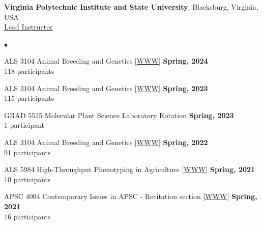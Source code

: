 \documentclass[margin,line,10pt]{res}
\newenvironment{list2}{
  \begin{list}{$\bullet$}{%
      \setlength{\itemsep}{0in}
      \setlength{\parsep}{0in} \setlength{\parskip}{0in}
      \setlength{\topsep}{0in} \setlength{\partopsep}{0in} 
      \setlength{\leftmargin}{0.2in}}}{\end{list}}
\begin{document}
\begin{resume}
{\bf Virginia Polytechnic Institute and State University}, Blacksburg, Virginia, USA  \vspace{0.2cm} \\
\underline{Lead Instructor}
\vspace{0.4cm}
\begin{list2}


  \item ALS 3104 Animal Breeding and Genetics [\textcolor{blue}{\href{http://morotalab.org/als3104-2022/ALS3104.html}{WWW}}] 
  \hfill {\bf Spring, 2024} \\
         118  participants 
  
         \vspace{0.5cm}


  \item ALS 3104 Animal Breeding and Genetics [\textcolor{blue}{\href{http://morotalab.org/als3104-2022/ALS3104.html}{WWW}}] 
  \hfill {\bf Spring, 2023} \\
         115  participants 
  
         \vspace{0.5cm}

  \item GRAD 5515 Molecular Plant Science Laboratory Rotation
  \hfill {\bf Spring, 2023} \\
  1 participant

  \vspace{0.5cm}

   \item ALS 3104 Animal Breeding and Genetics [\textcolor{blue}{\href{http://morotalab.org/als3104-2022/ALS3104.html}{WWW}}] 
  \hfill {\bf Spring, 2022} \\
         91  participants 
  
         \vspace{0.5cm}
         

  \item ALS 5984 High-Throughput Phenotyping in Agriculture [\textcolor{blue}{\href{http://morotalab.org/als5984-2021/ALS5984.html}{WWW}}] 
  \hfill {\bf Spring, 2021} \\
         10  participants 
  
         \vspace{0.5cm}

         
  \item APSC 4004 Contemporary Issues in APSC - Recitation section [\textcolor{blue}{\href{http://morotalab.org/apsc4004-2021/syllabus4004-10730.pdf}{WWW}}] 
  \hfill {\bf Spring, 2021} \\
         16  participants 
  

\end{list2}
\end{resume}
\end{document}

